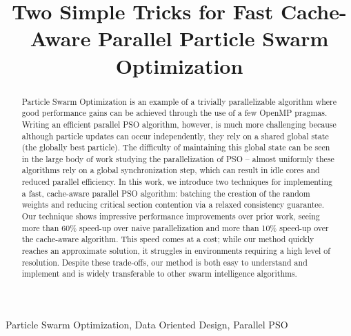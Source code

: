 \documentclass[conference]{IEEEtran}
\begin{document}
\title{Two Simple Tricks for Fast Cache-Aware Parallel Particle Swarm Optimization}

\author{
\and
{}
}

\maketitle

\begin{abstract}
Particle Swarm Optimization is an example of a trivially parallelizable
algorithm where good performance gains can be achieved through the use of a few
OpenMP pragmas. Writing an efficient parallel PSO algorithm, however, is much more
challenging because although particle updates can occur independently, they
rely on a shared global state (the globally best particle). The difficulty of
maintaining this global state can be seen in the large body of work studying the
parallelization of PSO -- almost uniformly these algorithms rely on a global
synchronization step, which can result in idle cores and reduced parallel
efficiency. In this work, we introduce two techniques for implementing a fast,
cache-aware parallel PSO algorithm: batching the creation of the random weights
and reducing critical section contention via a relaxed consistency guarantee.
Our technique shows impressive performance improvements over prior work, seeing
more than 60\% speed-up over naive parallelization and more than 10\% speed-up
over the cache-aware algorithm. This speed comes at a cost; while our method
quickly reaches an approximate solution, it struggles in environments requiring
a high level of resolution. Despite these trade-offs, our method is both
easy to understand and implement and is widely transferable to other
swarm intelligence algorithms.
\end{abstract}

\begin{IEEEkeywords}
Particle Swarm Optimization, Data Oriented Design, Parallel PSO
\end{IEEEkeywords}





\end{document}
